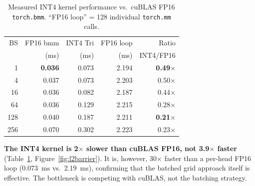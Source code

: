 \documentclass[10pt,twocolumn]{article}
\begin{document}
\begin{table}[h]
\centering
\small
\caption{Measured INT4 kernel performance vs.\ cuBLAS FP16 \texttt{torch.bmm}.  ``FP16 loop'' = 128 individual \texttt{torch.mm} calls.}
\label{tab:int4_measured}
\begin{tabular}{@{}rrrrr@{}}
\toprule
BS & FP16 bmm & INT4 Tri & FP16 loop & Ratio \\
   & (ms) & (ms) & (ms) & INT4/FP16 \\
\midrule
  1 & \textbf{0.036} & 0.073 & 2.194 & \textbf{0.49$\times$} \\
  4 & 0.037 & 0.073 & 2.203 & 0.50$\times$ \\
 16 & 0.036 & 0.082 & 2.187 & 0.44$\times$ \\
 64 & 0.036 & 0.129 & 2.215 & 0.28$\times$ \\
128 & 0.040 & 0.187 & 2.211 & \textbf{0.21$\times$} \\
256 & 0.070 & 0.302 & 2.223 & 0.23$\times$ \\
\bottomrule
\end{tabular}
\end{table}

\textbf{The INT4 kernel is 2$\times$ slower than cuBLAS FP16, not 3.9$\times$ faster} (Table~\ref{tab:int4_measured}, Figure~\ref{fig:l2barrier}).  It is, however, 30$\times$ faster than a per-head FP16 loop (0.073~ms vs.\ 2.19~ms), confirming that the batched grid approach itself is effective.  The bottleneck is competing with cuBLAS, not the batching strategy.
\end{document}
